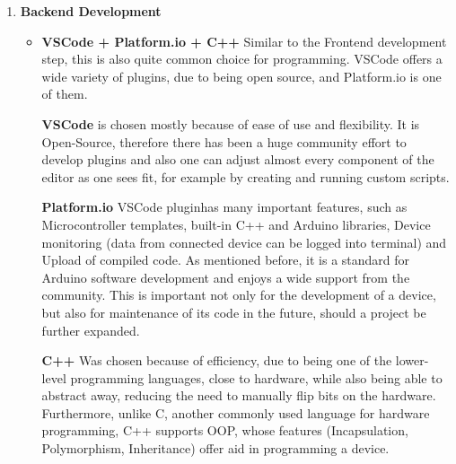 \begin{enumerate}
\begin{itemize}
		\textbf{Kotlin} was chosen because an alternative would be Java, which is not personally preferred development language. Besides being industry standard, Kotlin has very easy-to-understand syntax, \textit{Null-Safety} (a feature of the language, which prevents certain variables to have a null values i.e. value, the pointer of which doesn't have an address), that prevents very common Null-pointer exception runtime errors and also google's official trainings and tutorials which were essential in learning the language.
		\item \textbf{nRF Connect} is an Android app that allows troubleshooting \ac{BLE} connection issues. it displays important information about \ac{BLE} stack of the connected device, which helps finding "lost" characteristics.  
	\end{itemize}
	\item\textbf{Backend Development}
	\begin{itemize}
		
		\item \textbf{VSCode + Platform.io + C++} Similar to the Frontend development step, this is also quite common choice for programming. \ac{VSCode} offers a wide variety of plugins, due to being open source, and Platform.io is one of them. 
		
		\textbf{VSCode} is chosen mostly because of ease of use and flexibility. It is Open-Source, therefore there has been a huge community effort to develop plugins and also one can adjust almost every component of the editor as one sees fit, for example by creating and running custom scripts.
		
		\textbf{Platform.io} \ac{VSCode} pluginhas many important features, such as Microcontroller templates, built-in C++ and Arduino libraries, Device monitoring (data from connected device can be logged into terminal) and Upload of compiled code. As mentioned before, it is a standard for Arduino software development and enjoys a wide support from the community. This is important not only for the development of a device, but also for maintenance of its code in the future, should a project be further expanded.
		
		\textbf{C++} Was chosen because of efficiency, due to being one of the lower-level programming languages, close to hardware, while also being able to abstract away, reducing the need to manually flip bits on the hardware. Furthermore, unlike C, another commonly used language for hardware programming, C++ supports \ac{OOP}, whose features (Incapsulation, Polymorphism, Inheritance) offer aid in programming a device.
		
	\end{itemize}
	
\end{enumerate}